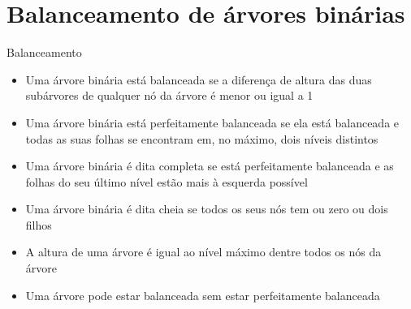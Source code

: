 \section{Balanceamento de árvores binárias}

\begin{frame}[fragile]{Balanceamento}

	\begin{itemize}
		\item Uma árvore binária está balanceada se a diferença de altura das duas subárvores de 
            qualquer nó da árvore é menor ou igual a 1

        \item Uma árvore binária está perfeitamente balanceada se ela está 
            balanceada e todas as suas folhas se encontram em, no máximo, dois níveis distintos

        \item Uma árvore binária é dita completa se está perfeitamente balanceada 
            e as folhas do seu último nível estão mais à esquerda possível

        \item Uma árvore binária é dita cheia se todos os seus nós tem ou zero 
            ou dois filhos

        \item A altura de uma árvore é igual ao nível máximo dentre todos os nós da árvore

        \item Uma árvore pode estar balanceada sem estar perfeitamente balanceada
	\end{itemize}

\end{frame} 
 

